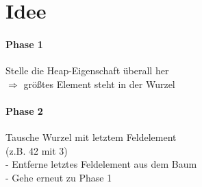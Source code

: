 \section{Idee}
\paragraph{Phase 1} Stelle die Heap-Eigenschaft überall her\\
$\Rightarrow$ größtes Element steht in der Wurzel
\paragraph{Phase 2} Tausche Wurzel mit letztem Feldelement\\
(z.B. 42 mit 3)\\
- Entferne letztes Feldelement aus dem Baum\\
- Gehe erneut zu Phase 1
